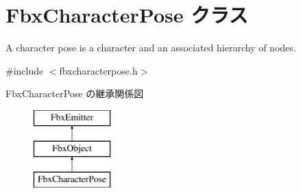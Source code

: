 \hypertarget{class_fbx_character_pose}{}\section{Fbx\+Character\+Pose クラス}
\label{class_fbx_character_pose}


A character pose is a character and an associated hierarchy of nodes.  




{\ttfamily \#include $<$fbxcharacterpose.\+h$>$}

Fbx\+Character\+Pose の継承関係図\begin{figure}[H]
\begin{center}
\leavevmode
\includegraphics[height=3.000000cm]{class_fbx_character_pose}
\end{center}
\end{figure}
